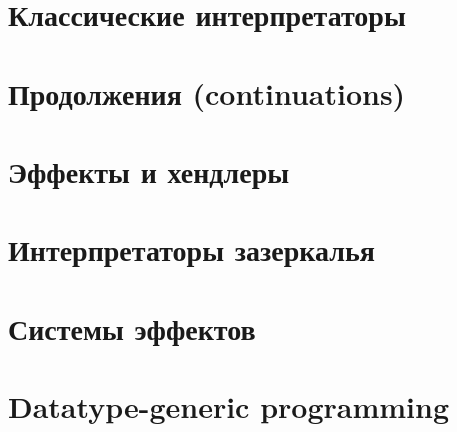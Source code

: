 \documentclass[12pt]{article}
\begin{document}


    \section{Классические интерпретаторы}

%    
%


    \section{Продолжения (continuations)} \label{sec:continuations}
%
%    
%


    \section{Эффекты и хендлеры} \label{sec:effect-handlers}
%
%
%    


    \section{Интерпретаторы зазеркалья} \label{sec:wonder-interpreters}
%
%    
%


%
%    


    \section{Системы эффектов} \label{sec:effect-systems}
%
%    
%


    \section{Datatype-generic programming} \label{sec:datatype-generic}
%
%    
%




%
%    
\end{document}
